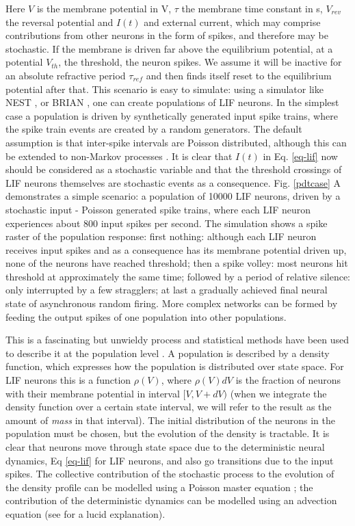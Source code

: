 \documentclass[10pt]{article}
\begin{document}
Here $V$ is the membrane potential in V, $\tau$ the membrane time constant in s, $V_{rev}$ the reversal potential and $I(t)$ and external current, which may comprise contributions from other neurons in the form of spikes, and therefore may be stochastic.
If the membrane is driven far above the equilibrium potential, at a potential $V_{th}$, the threshold, the neuron spikes.
We assume it will be inactive for an absolute refractive period $\tau_{ref}$ and then finds itself reset to the equilibrium potential after that.  
This scenario is easy to simulate: using a simulator like NEST \cite{gewaltig2007nest}, or BRIAN \cite{stimberg2014equation}, one can create populations of LIF neurons.
In the simplest case a population is driven by synthetically generated input spike trains, where the spike train events are created by a random generators.
The default assumption is that inter-spike intervals are Poisson distributed, although this can be extended to non-Markov processes \cite{lai2017population}.
It is clear that $I(t)$ in Eq. \ref{eq-lif} now should be considered as a stochastic variable and that the threshold crossings of LIF neurons themselves are stochastic events as a consequence.
Fig. \ref{pdtcase} A  demonstrates a simple scenario: a population of 10000 LIF neurons, driven by a stochastic input - Poisson generated spike trains, where each LIF neuron experiences about 800 input spikes per second.
The simulation shows a spike raster of the population response:
first nothing: although each LIF neuron receives input spikes and as a consequence has its membrane potential driven up, none of the neurons have reached threshold;
then a spike volley: most neurons hit threshold at approximately the same time;
followed by a period of relative silence: only interrupted by a few stragglers;
at last a gradually achieved final neural state of asynchronous random firing.
More complex networks can be formed by feeding the output spikes of one population into other populations.

This is a fascinating but unwieldy process and statistical methods have been used to describe it at the population level \cite{stein1967some,knight1972dynamics,omurtag2000simulation}.
A population is described by a density function, which expresses how the population is distributed over state space.
For LIF neurons this is a function $\rho(V)$, where $\rho(V)dV$ is the fraction of neurons with their membrane potential in interval $[V, V + dV)$ (when we integrate the density function over a certain state interval, we will refer to the  result as  the amount of \emph{mass} in that interval).
The initial distribution of the neurons in the population must be chosen, but the evolution of the density is tractable.
It is clear that neurons move through state space due to the deterministic neural dynamics, Eq \ref{eq-lif} for LIF neurons, and also go transitions due to the input spikes.
The collective contribution of the stochastic process to the evolution of the density profile can be  modelled using a Poisson master equation \cite{crispin1994handbook}; the contribution of the deterministic dynamics  can be modelled using an advection equation (see \cite{omurtag2000simulation} for a lucid explanation). 
\end{document}
